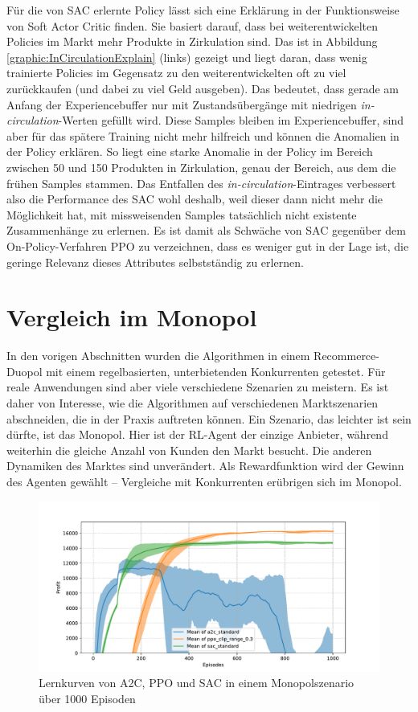 Für die von SAC erlernte Policy lässt sich eine Erklärung in der Funktionsweise von Soft Actor Critic finden.
Sie basiert darauf, dass bei weiterentwickelten Policies im Markt mehr Produkte in Zirkulation sind.
Das ist in Abbildung \ref{graphic:InCirculationExplain} (links) gezeigt und liegt daran, dass wenig trainierte Policies im Gegensatz zu den weiterentwickelten oft zu viel zurückkaufen (und dabei zu viel Geld ausgeben).
Das bedeutet, dass gerade am Anfang der Experiencebuffer nur mit Zustandsübergänge mit niedrigen \textit{in-circulation}-Werten gefüllt wird.
Diese Samples bleiben im Experiencebuffer, sind aber für das spätere Training nicht mehr hilfreich und können die Anomalien in der Policy erklären.
So liegt eine starke Anomalie in der Policy im Bereich zwischen 50 und 150 Produkten in Zirkulation, genau der Bereich, aus dem die frühen Samples stammen.
Das Entfallen des \textit{in-circulation}-Eintrages verbessert also die Performance des SAC wohl deshalb, weil dieser dann nicht mehr die Möglichkeit hat, mit missweisenden Samples tatsächlich nicht existente Zusammenhänge zu erlernen.
Es ist damit als Schwäche von SAC gegenüber dem On-Policy-Verfahren PPO zu verzeichnen, dass es weniger gut in der Lage ist, die geringe Relevanz dieses Attributes selbstständig zu erlernen.

\section{Vergleich im Monopol}
In den vorigen Abschnitten wurden die Algorithmen in einem Recommerce-Duopol mit einem regelbasierten, unterbietenden Konkurrenten getestet.
Für reale Anwendungen sind aber viele verschiedene Szenarien zu meistern.
Es ist daher von Interesse, wie die Algorithmen auf verschiedenen Marktszenarien abschneiden, die in der Praxis auftreten können.
Ein Szenario, das leichter ist sein dürfte, ist das Monopol.
Hier ist der RL-Agent der einzige Anbieter, während weiterhin die gleiche Anzahl von Kunden den Markt besucht.
Die anderen Dynamiken des Marktes sind unverändert.
Als Rewardfunktion wird der Gewinn des Agenten gewählt -- Vergleiche mit Konkurrenten erübrigen sich im Monopol.

\begin{figure}[htb]
	\centering
	\includegraphics[width=\textwidth]{main/comparison_monopoly.pdf}
	\caption{Lernkurven von A2C, PPO und SAC in einem Monopolszenario über 1000 Episoden}
	\label{graphic:MonopolyComparison}
\end{figure}

